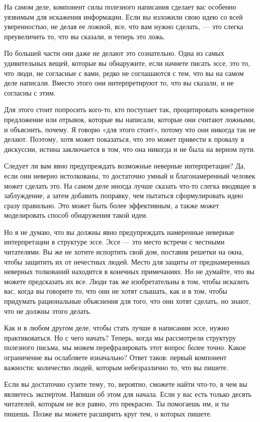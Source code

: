\documentclass[ebook,12pt,oneside,openany]{memoir}
\begin{document}
На самом деле, компонент силы полезного написания сделает вас особенно
уязвимым для искажения информации. Если вы изложили свою идею со всей
уверенностью, не делая ее ложной, все, что вам нужно сделать, — это
слегка преувеличить то, что вы сказали, и теперь это ложь.

По большей части они даже не делают это сознательно. Одна из самых
удивительных вещей, которые вы обнаружите, если начнете писать эссе,
это то, что люди, не согласные с вами, редко не соглашаются с тем, что
вы на самом деле написали. Вместо этого они интерпретируют то, что вы
сказали, и не согласны с этим.

Для этого стоит попросить кого-то, кто поступает так, процитировать
конкретное предложение или отрывок, которые вы написали, которые они
считают ложными, и объяснить, почему. Я говорю «для этого стоит»,
потому что они никогда так не делают. Поэтому, хотя может показаться,
что это может привести к провалу в дискуссии, истина заключается в
том, что она никогда и не была на верном пути.

Следует ли вам явно предупреждать возможные неверные интерпретации?
Да, если они неверно истолкованы, то достаточно умный и
благонамеренный человек может сделать это. На самом деле иногда лучше
сказать что-то слегка вводящее в заблуждение, а затем добавить
поправку, чем пытаться сформулировать идею сразу правильно. Это может
быть более эффективным, а также может моделировать способ обнаружения
такой идеи.

Но я не думаю, что вы должны явно предупреждать намеренные неверные
интерпретации в структуре эссе. Эссе — это место встречи с честными
читателями. Вы же не хотите испортить свой дом, поставив решетки на
окна, чтобы защитить их от нечестных людей. Место для защиты от
преднамеренных неверных толкований находится в конечных примечаниях.
Но не думайте, что вы можете предсказать их все. Люди так же
изобретательны в том, чтобы исказить вас, когда вы говорите то, что
они не хотят слышать, как и в том, чтобы придумать рациональные
объяснения для того, что они хотят сделать, но знают, что не должны
этого делать.

Как и в любом другом деле, чтобы стать лучше в написании эссе, нужно
практиковаться. Но с чего начать? Теперь, когда мы рассмотрели
структуру полезного письма, мы можем перефразировать этот вопрос более
точно. Какое ограничение вы ослабляете изначально? Ответ таков: первый
компонент важности: количество людей, которым небезразлично то, что вы
пишете.

Если вы достаточно сузите тему, то, вероятно, сможете найти что-то, в
чем вы являетесь экспертом. Напиши об этом для начала. Если у вас есть
только десять читателей, которым не все равно, это прекрасно. Ты
помогаешь им, и ты пишешь. Позже вы можете расширить круг тем, о
которых пишете.
\end{document}
